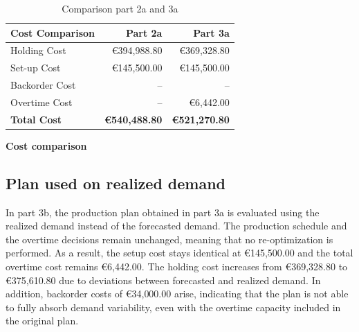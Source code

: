 \documentclass[a4paper,faculty=eb,language=en,doctype=article,sftitles=false]{ugent-doc}
\begin{document}
\begin{table}[H]
\centering
\begin{minipage}[c]{0.44\textwidth}
\centering
\begin{tabular}{lrr}
\toprule
\textbf{Cost Comparison} & \textbf{Part 2a} & \textbf{Part 3a} \\
\midrule
Holding Cost   & €394{,}988.80 & €369{,}328.80 \\
Set-up Cost    & €145{,}500.00 & €145{,}500.00 \\
Backorder Cost & --            & -- \\
Overtime Cost  & --            & €6{,}442.00 \\
\midrule
\textbf{Total Cost} & \textbf{€540{,}488.80} & \textbf{€521{,}270.80} \\
\bottomrule
\end{tabular}
\end{minipage}
\hspace{0.06\textwidth}
\begin{minipage}[c]{0.44\textwidth}
\centering
\textbf{Cost comparison}

\vspace{0.3em}
\end{minipage}
\caption{Comparison part 2a and 3a}
\end{table}

\subsection{Plan used on realized demand}

In part 3b, the production plan obtained in part 3a is evaluated using the realized demand instead of the forecasted demand. The production schedule and the overtime decisions remain unchanged, meaning that no re-optimization is performed. As a result, the setup cost stays identical at €145{,}500.00 and the total overtime cost remains €6{,}442.00. The holding cost increases from €369{,}328.80 to €375{,}610.80 due to deviations between forecasted and realized demand. In addition, backorder costs of €34{,}000.00 arise, indicating that the plan is not able to fully absorb demand variability, even with the overtime capacity included in the original plan.
\end{document}
